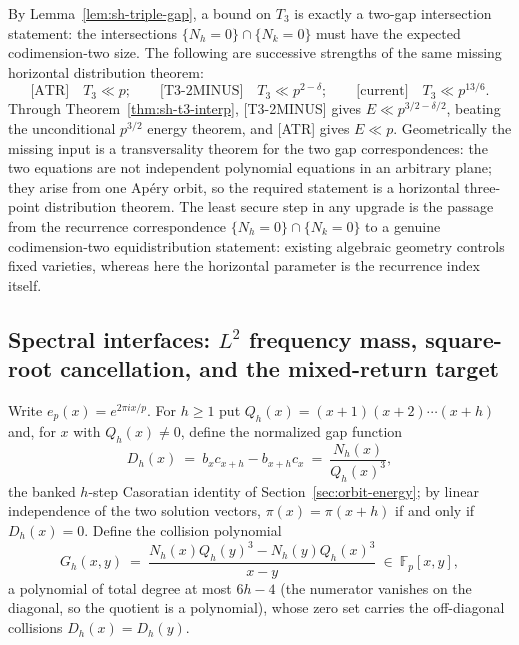 \begin{remark}
\label{rem:sh-triple-hierarchy}
By Lemma~\ref{lem:sh-triple-gap}, a bound on $T_3$ is exactly a
two-gap intersection statement: the intersections
$\{N_h=0\}\cap\{N_k=0\}$ must have the expected codimension-two size.
The following are successive strengths of the same missing horizontal
distribution theorem:
\[
 \text{[ATR]}\quad T_3\ll p;
 \qquad
 \text{[T3-2MINUS]}\quad T_3\ll p^{2-\delta};
 \qquad
 \text{[current]}\quad T_3\ll p^{13/6}.
\]
Through Theorem~\ref{thm:sh-t3-interp}, [T3-2MINUS] gives
$E\ll p^{3/2-\delta/2}$, beating the unconditional $p^{3/2}$ energy
theorem, and [ATR] gives $E\ll p$.  Geometrically the missing input is a
transversality theorem for the two gap correspondences: the two
equations are not independent polynomial equations in an arbitrary
plane; they arise from one Ap\'ery orbit, so the required statement is a
horizontal three-point distribution theorem.  The least secure step in
any upgrade is the passage from the recurrence correspondence
$\{N_h=0\}\cap\{N_k=0\}$ to a genuine codimension-two equidistribution
statement: existing algebraic geometry controls fixed varieties, whereas
here the horizontal parameter is the recurrence index itself.
\end{remark}

\subsection{Spectral interfaces: $L^2$ frequency mass, square-root
cancellation, and the mixed-return target}
\label{sec:sh-spectral}

Write $e_p(x)=e^{2\pi ix/p}$.  For $h\ge1$ put
$Q_h(x)=(x+1)(x+2)\cdots(x+h)$ and, for $x$ with $Q_h(x)\ne0$, define
the normalized gap function
\begin{equation}\label{eq:sh-Dh}
 D_h(x)\ =\ b_xc_{x+h}-b_{x+h}c_x\ =\ \frac{N_h(x)}{Q_h(x)^3},
\end{equation}
the banked $h$-step Casoratian identity of
Section~\ref{sec:orbit-energy}; by linear independence of the two
solution vectors, $\pi(x)=\pi(x+h)$ if and only if $D_h(x)=0$.  Define
the collision polynomial
\begin{equation}\label{eq:sh-Gh}
 G_h(x,y)\ =\ \frac{N_h(x)Q_h(y)^3-N_h(y)Q_h(x)^3}{x-y}
 \ \in\ \mathbb F_p[x,y],
\end{equation}
a polynomial of total degree at most $6h-4$ (the numerator vanishes on
the diagonal, so the quotient is a polynomial), whose zero set carries
the off-diagonal collisions $D_h(x)=D_h(y)$.

